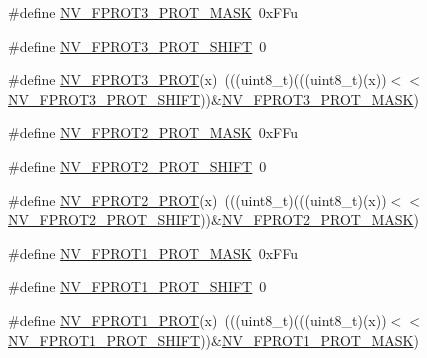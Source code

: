 \begin{DoxyCompactItemize}
\item 
\#define \hyperlink{group___n_v___register___masks_ga1a2ecc3ba1f6ae4c2db7fcaa8f369b34}{N\+V\+\_\+\+F\+P\+R\+O\+T3\+\_\+\+P\+R\+O\+T\+\_\+\+M\+A\+SK}~0x\+F\+Fu
\item 
\#define \hyperlink{group___n_v___register___masks_gaee74e224c0572f7618f28c11d921b6e3}{N\+V\+\_\+\+F\+P\+R\+O\+T3\+\_\+\+P\+R\+O\+T\+\_\+\+S\+H\+I\+FT}~0
\item 
\#define \hyperlink{group___n_v___register___masks_ga67cd7aad5307a5ee8de3a2dd16c6315c}{N\+V\+\_\+\+F\+P\+R\+O\+T3\+\_\+\+P\+R\+OT}(x)~(((uint8\+\_\+t)(((uint8\+\_\+t)(x))$<$$<$\hyperlink{group___n_v___register___masks_gaee74e224c0572f7618f28c11d921b6e3}{N\+V\+\_\+\+F\+P\+R\+O\+T3\+\_\+\+P\+R\+O\+T\+\_\+\+S\+H\+I\+FT}))\&\hyperlink{group___n_v___register___masks_ga1a2ecc3ba1f6ae4c2db7fcaa8f369b34}{N\+V\+\_\+\+F\+P\+R\+O\+T3\+\_\+\+P\+R\+O\+T\+\_\+\+M\+A\+SK})
\item 
\#define \hyperlink{group___n_v___register___masks_ga99b7ccf89e4d3cc80d0317086202de0f}{N\+V\+\_\+\+F\+P\+R\+O\+T2\+\_\+\+P\+R\+O\+T\+\_\+\+M\+A\+SK}~0x\+F\+Fu
\item 
\#define \hyperlink{group___n_v___register___masks_ga50f9336b86839704ca20297b040c3ca5}{N\+V\+\_\+\+F\+P\+R\+O\+T2\+\_\+\+P\+R\+O\+T\+\_\+\+S\+H\+I\+FT}~0
\item 
\#define \hyperlink{group___n_v___register___masks_ga3361ca8560d8cdf09a1efcc0b83950fe}{N\+V\+\_\+\+F\+P\+R\+O\+T2\+\_\+\+P\+R\+OT}(x)~(((uint8\+\_\+t)(((uint8\+\_\+t)(x))$<$$<$\hyperlink{group___n_v___register___masks_ga50f9336b86839704ca20297b040c3ca5}{N\+V\+\_\+\+F\+P\+R\+O\+T2\+\_\+\+P\+R\+O\+T\+\_\+\+S\+H\+I\+FT}))\&\hyperlink{group___n_v___register___masks_ga99b7ccf89e4d3cc80d0317086202de0f}{N\+V\+\_\+\+F\+P\+R\+O\+T2\+\_\+\+P\+R\+O\+T\+\_\+\+M\+A\+SK})
\item 
\#define \hyperlink{group___n_v___register___masks_ga4ca39bad3b57769cb423f1616c985e38}{N\+V\+\_\+\+F\+P\+R\+O\+T1\+\_\+\+P\+R\+O\+T\+\_\+\+M\+A\+SK}~0x\+F\+Fu
\item 
\#define \hyperlink{group___n_v___register___masks_ga06d0cb2797f243b77d60cfecedfc9f86}{N\+V\+\_\+\+F\+P\+R\+O\+T1\+\_\+\+P\+R\+O\+T\+\_\+\+S\+H\+I\+FT}~0
\item 
\#define \hyperlink{group___n_v___register___masks_ga04b1531f415057befbd26a0bad3bd7e6}{N\+V\+\_\+\+F\+P\+R\+O\+T1\+\_\+\+P\+R\+OT}(x)~(((uint8\+\_\+t)(((uint8\+\_\+t)(x))$<$$<$\hyperlink{group___n_v___register___masks_ga06d0cb2797f243b77d60cfecedfc9f86}{N\+V\+\_\+\+F\+P\+R\+O\+T1\+\_\+\+P\+R\+O\+T\+\_\+\+S\+H\+I\+FT}))\&\hyperlink{group___n_v___register___masks_ga4ca39bad3b57769cb423f1616c985e38}{N\+V\+\_\+\+F\+P\+R\+O\+T1\+\_\+\+P\+R\+O\+T\+\_\+\+M\+A\+SK})
$$
\end{DoxyCompactItemize}
